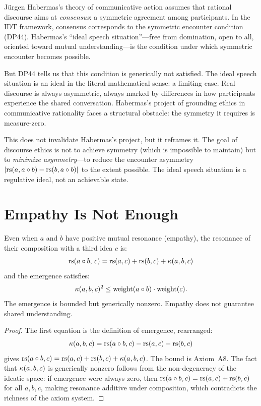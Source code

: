 J\"urgen Habermas's theory of communicative action assumes that rational
discourse aims at \emph{consensus}: a symmetric agreement among participants.
In the IDT framework, consensus corresponds to the symmetric encounter
condition (DP44).  Habermas's ``ideal speech situation''---free from domination,
open to all, oriented toward mutual understanding---is the condition under
which symmetric encounter becomes possible.

But DP44 tells us that this condition is generically not satisfied.  The ideal
speech situation is an ideal in the literal mathematical sense: a limiting
case.  Real discourse is always asymmetric, always marked by differences in
how participants experience the shared conversation.  Habermas's project of
grounding ethics in communicative rationality faces a structural obstacle:
the symmetry it requires is measure-zero.

This does not invalidate Habermas's project, but it reframes it.  The goal of
discourse ethics is not to achieve symmetry (which is impossible to maintain)
but to \emph{minimize asymmetry}---to reduce the encounter asymmetry
$|\mathrm{rs}(a, a \circ b) - \mathrm{rs}(b, a \circ b)|$ to the extent possible.
The ideal speech situation is a regulative ideal, not an achievable state.

\section{Empathy Is Not Enough}

\begin{theorem}
\label{thm:empathy-not-enough}
Even when $a$ and $b$ have positive mutual resonance (empathy), the resonance
of their composition with a third idea $c$ is:
\[
\mathrm{rs}(a \circ b,\, c) = \mathrm{rs}(a, c) + \mathrm{rs}(b, c) + \kappa(a, b, c)
\]
and the emergence satisfies:
\[
\kappa(a, b, c)^2 \leq \mathrm{weight}(a \circ b) \cdot \mathrm{weight}(c).
\]
The emergence is bounded but generically nonzero.  Empathy does not guarantee
shared understanding.
\end{theorem}

\begin{proof}
The first equation is the definition of emergence, rearranged:
\[
\kappa(a, b, c) = \mathrm{rs}(a \circ b, c) - \mathrm{rs}(a, c) - \mathrm{rs}(b, c)
\]
gives $\mathrm{rs}(a \circ b, c) = \mathrm{rs}(a, c) + \mathrm{rs}(b, c) + \kappa(a, b, c)$.
The bound is Axiom~A8.  The fact that $\kappa(a, b, c)$ is generically
nonzero follows from the non-degeneracy of the ideatic space: if emergence
were always zero, then $\mathrm{rs}(a \circ b, c) = \mathrm{rs}(a, c) + \mathrm{rs}(b, c)$ for
all $a, b, c$, making resonance additive under composition, which contradicts
the richness of the axiom system.
\end{proof}

